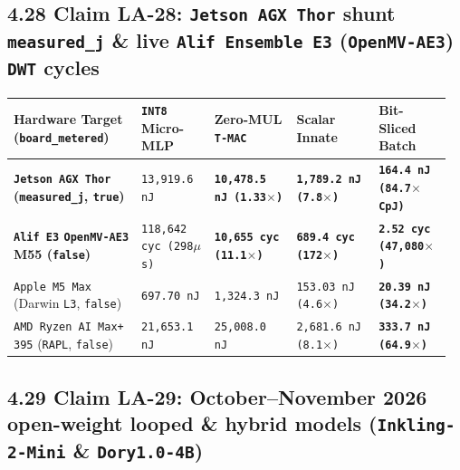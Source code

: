 \documentclass[10pt]{article}
\begin{document}
\subsection{4.28 Claim LA-28: \texttt{Jetson AGX Thor} shunt \texttt{measured\_j} \& live \texttt{Alif Ensemble E3} (\texttt{OpenMV-AE3}) \texttt{DWT} cycles}\label{claim-la28}

{\footnotesize\setlength{\tabcolsep}{2.2pt}
\begin{longtable}{@{}L{0.28\linewidth}C{0.16\linewidth}C{0.18\linewidth}C{0.18\linewidth}C{0.16\linewidth}@{}}
\toprule
\textbf{Hardware Target (\texttt{board\_metered})} & \textbf{\texttt{INT8} Micro-MLP} & \textbf{Zero-MUL \texttt{T-MAC}} & \textbf{Scalar Innate} & \textbf{Bit-Sliced Batch} \\
\midrule
\endhead
\textbf{\texttt{Jetson AGX Thor} (\texttt{measured\_j}, \texttt{true})} & \texttt{13,919.6 nJ} & \textbf{\texttt{10,478.5 nJ (1.33$\times$)}} & \textbf{\texttt{1,789.2 nJ (7.8$\times$)}} & \textbf{\texttt{164.4 nJ (84.7$\times$ CpJ)}} \\
\textbf{\texttt{Alif E3} \texttt{OpenMV-AE3} M55 (\texttt{false})} & \texttt{118,642 cyc (298$\mu$s)} & \textbf{\texttt{10,655 cyc (11.1$\times$)}} & \textbf{\texttt{689.4 cyc (172$\times$)}} & \textbf{\texttt{2.52 cyc (47,080$\times$)}} \\
\texttt{Apple M5 Max} (Darwin \texttt{L3}, \texttt{false}) & \texttt{697.70 nJ} & \texttt{1,324.3 nJ} & \texttt{153.03 nJ (4.6$\times$)} & \textbf{\texttt{20.39 nJ (34.2$\times$)}} \\
\texttt{AMD Ryzen AI Max+ 395} (\texttt{RAPL}, \texttt{false}) & \texttt{21,653.1 nJ} & \texttt{25,008.0 nJ} & \texttt{2,681.6 nJ (8.1$\times$)} & \textbf{\texttt{333.7 nJ (64.9$\times$)}} \\
\bottomrule
\end{longtable}
}

\subsection{4.29 Claim LA-29: October--November 2026 open-weight looped \& hybrid models (\texttt{Inkling-2-Mini} \& \texttt{Dory1.0-4B})}\label{claim-la29}
\end{document}
